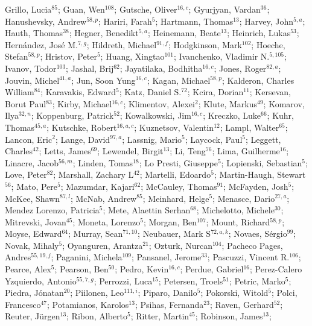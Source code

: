 Grillo, Lucia$^{85}$;
Guan, Wen$^{108}$;
Gutsche, Oliver$^{16,c}$;
Gyurjyan, Vardan$^{36}$;
Hanushevsky, Andrew$^{58,p}$;
Hariri, Farah$^{5}$;
Hartmann, Thomas$^{13}$;
Harvey, John$^{5,a}$;
Hauth, Thomas$^{38}$;
Hegner, Benedikt$^{5,a}$;
Heinemann, Beate$^{13}$;
Heinrich, Lukas$^{53}$;
Hernández, José M.$^{7,g}$;
Hildreth, Michael$^{91,f}$;
Hodgkinson, Mark$^{102}$;
Hoeche, Stefan$^{58,p}$;
Hristov, Peter$^{5}$;
Huang, Xingtao$^{101}$;
Ivanchenko, Vladimir N.$^{5,105}$;
Ivanov, Todor$^{103}$;
Jashal, Brij$^{62}$;
Jayatilaka, Bodhitha$^{16,c}$;
Jones, Roger$^{82,a}$;
Jouvin, Michel$^{41,a}$;
Jun, Soon Yung$^{16,c}$;
Kagan, Michael$^{58,p}$;
Kalderon, Charles William$^{84}$;
Karavakis, Edward$^{5}$;
Katz, Daniel S.$^{72}$;
Kcira, Dorian$^{11}$;
Kersevan, Borut Paul$^{83}$;
Kirby, Michael$^{16,c}$;
Klimentov, Alexei$^{2}$;
Klute, Markus$^{49}$;
Komarov, Ilya$^{32,n}$;
Koppenburg, Patrick$^{52}$;
Kowalkowski, Jim$^{16,c}$;
Kreczko, Luke$^{66}$;
Kuhr, Thomas$^{45,a}$;
Kutschke, Robert$^{16,a,c}$;
Kuznetsov, Valentin$^{12}$;
Lampl, Walter$^{65}$;
Lancon, Eric$^{2}$;
Lange, David$^{97,a}$;
Lassnig, Mario$^{5}$;
Laycock, Paul$^{5}$;
Leggett, Charles$^{42}$;
Letts, James$^{69}$;
Lewendel, Birgit$^{13}$;
Li, Teng$^{76}$;
Lima, Guilherme$^{16}$;
Linacre, Jacob$^{56,m}$;
Linden, Tomas$^{18}$;
Lo Presti, Giuseppe$^{5}$;
Lopienski, Sebastian$^{5}$;
Love, Peter$^{82}$;
Marshall, Zachary L$^{42}$;
Martelli, Edoardo$^{5}$;
Martin-Haugh, Stewart$^{56}$;
Mato, Pere$^{5}$;
Mazumdar, Kajari$^{62}$;
McCauley, Thomas$^{91}$;
McFayden, Josh$^{5}$;
McKee, Shawn$^{87,l}$;
McNab, Andrew$^{85}$;
Meinhard, Helge$^{5}$;
Menasce, Dario$^{27,a}$;
Mendez Lorenzo, Patricia$^{5}$;
Mete, Alaettin Serhan$^{68}$;
Michelotto, Michele$^{30}$;
Mitrevski, Jovan$^{45}$;
Moneta, Lorenzo$^{5}$;
Morgan, Ben$^{107}$;
Mount, Richard$^{58,p}$;
Moyse, Edward$^{64}$;
Murray, Sean$^{71,10}$;
Neubauer, Mark S$^{72,a,k}$;
Novaes, Sérgio$^{99}$;
Novak, Mihaly$^{5}$;
Oyanguren, Arantza$^{21}$;
Ozturk, Nurcan$^{104}$;
Pacheco Pages, Andres$^{55,19,j}$;
Paganini, Michela$^{109}$;
Pansanel, Jerome$^{33}$;
Pascuzzi, Vincent R.$^{106}$;
Pearce, Alex$^{5}$;
Pearson, Ben$^{50}$;
Pedro, Kevin$^{16,c}$;
Perdue, Gabriel$^{16}$;
Perez-Calero Yzquierdo, Antonio$^{55,7,g}$;
Perrozzi, Luca$^{15}$;
Petersen, Troels$^{51}$;
Petric, Marko$^{5}$;
Piedra, Jónatan$^{20}$;
Piilonen, Leo$^{111,i}$;
Piparo, Danilo$^{5}$;
Pokorski, Witold$^{5}$;
Polci, Francesco$^{47}$;
Potamianos, Karolos$^{13}$;
Psihas, Fernanda$^{23}$;
Raven, Gerhard$^{52}$;
Reuter, Jürgen$^{13}$;
Ribon, Alberto$^{5}$;
Ritter, Martin$^{45}$;
Robinson, James$^{13}$;
